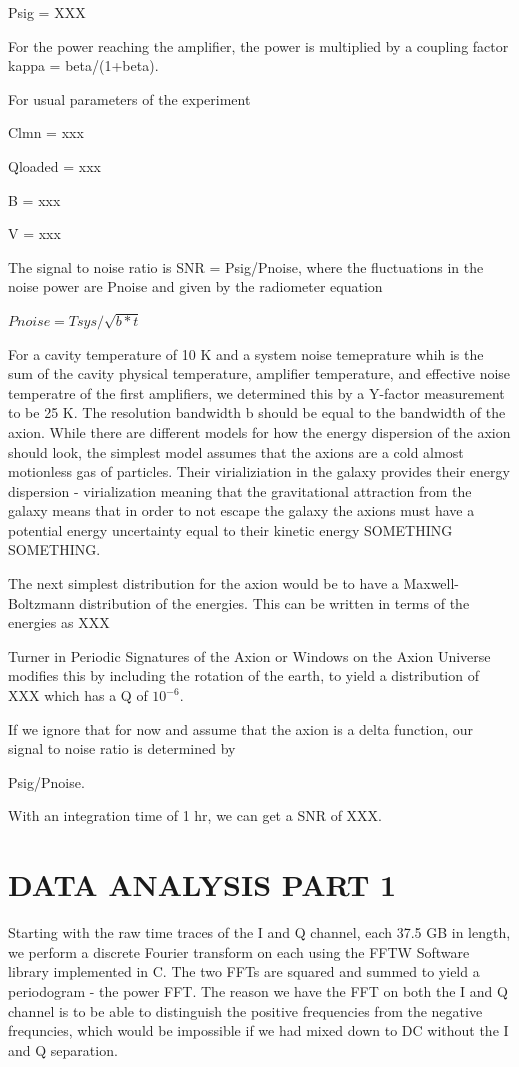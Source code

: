 \documentclass[11pt]{article}
\begin{document}
Psig = XXX

For the power reaching the amplifier, the power is multiplied by a coupling factor kappa = beta/(1+beta).

For usual parameters of the experiment

Clmn = xxx

Qloaded = xxx

B = xxx

V = xxx

The signal to noise ratio is SNR = Psig/Pnoise, where the fluctuations in the noise power are Pnoise and given by the radiometer equation

$Pnoise = Tsys/\sqrt{b*t} $

For a cavity temperature of 10 K and a system noise temeprature whih is the sum of the cavity physical temperature, amplifier temperature, and effective noise temperatre of the first amplifiers, we determined this by a Y-factor measurement to be 25 K. The resolution bandwidth b should be equal to the bandwidth of the axion. While there are different models for how the energy dispersion of the axion should look, the simplest model assumes that the axions are a cold almost motionless gas of particles. Their virializiation in the galaxy provides their energy dispersion - virialization meaning that the gravitational attraction from the galaxy means that in order to not escape the galaxy the axions must have a potential energy uncertainty equal to their kinetic energy SOMETHING SOMETHING.

The next simplest distribution for the axion would be to have a Maxwell-Boltzmann distribution of the energies. This can be written in terms of the energies as XXX

Turner in Periodic Signatures of the Axion or Windows on the Axion Universe modifies this by including the rotation of the earth, to yield a distribution of XXX which has a Q of $10^{-6}$.

If we ignore that for now and assume that the axion is a delta function, our signal to noise ratio is determined by 

Psig/Pnoise.

With an integration time of 1 hr, we can get a SNR of XXX.

\section{DATA ANALYSIS PART 1}

Starting with the raw time traces of the I and Q channel, each 37.5 GB in length, we perform a discrete Fourier transform on each using the FFTW Software library implemented in C. The two FFTs are squared and summed to yield a periodogram - the power FFT. The reason we have the FFT on both the I and Q channel is to be able to distinguish the positive frequencies from the negative frequncies, which would be impossible if we had mixed down to DC without the I and Q separation.
\end{document}
